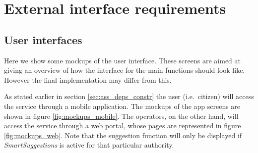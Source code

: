 \section{External interface requirements}

\subsection{User interfaces}
Here we show some mockups of the user interface. These screens are aimed at
giving an overview of how the interface for the main functions should look like.
However the final implementation may differ from this.

As stated earlier in section \vref{sec:ass_deps_constr} the user (i.e.\
citizen) will access the service through a mobile application. The mockups
of the app screens are shown in figure \vref{fig:mockups_mobile}.
The operators, on the other hand, will access the service through a web portal,
whose pages are represented in figure \vref{fig:mockups_web}. Note that the
suggestion function will only be displayed if \emph{SmartSuggestions} is active
for that particular authority.

